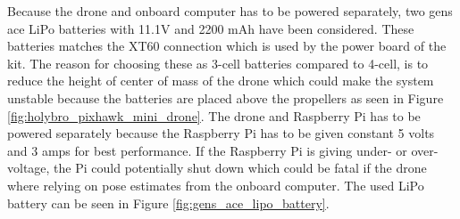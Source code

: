 \documentclass[../Head/report.tex]{subfiles}
\begin{document}
Because the drone and onboard computer has to be powered separately, two gens ace LiPo batteries with 11.1V and 2200 mAh have been considered. These batteries matches the XT60 connection which is used by the power board of the kit. The reason for choosing these as 3-cell batteries compared to 4-cell, is to reduce the height of center of mass of the drone which could make the system unstable because the batteries are placed above the propellers as seen in Figure \ref{fig:holybro_pixhawk_mini_drone}. The drone and Raspberry Pi has to be powered separately because the Raspberry Pi has to be given constant 5 volts and 3 amps for best performance. If the Raspberry Pi is giving under- or over-voltage, the Pi could potentially shut down which could be fatal if the drone where relying on pose estimates from the onboard computer. The used LiPo battery can be seen in Figure \ref{fig:gens_ace_lipo_battery}.  
\end{document}
